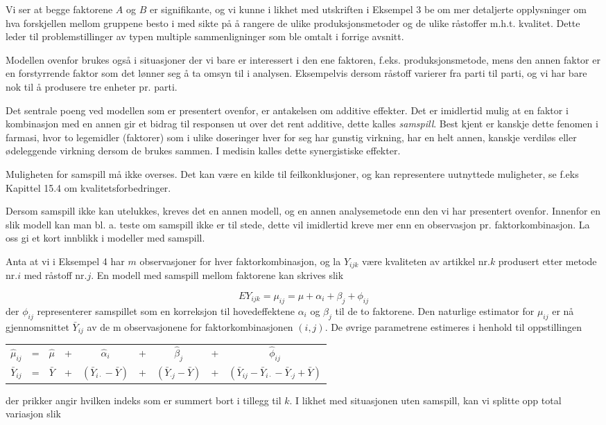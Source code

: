 \noindent Vi ser at begge faktorene $A$ og $B$ er signifikante, og vi kunne
i likhet med utskriften i Eksempel 3 be om mer detaljerte opplysninger om
hva forskjellen mellom gruppene besto i med sikte på å rangere
de ulike produksjonsmetoder og de ulike råstoffer m.h.t. kvalitet.
Dette leder til problemstillinger av typen multiple sammenligninger
som ble omtalt i forrige avsnitt.

Modellen ovenfor brukes også i situasjoner der vi bare er interessert
i den ene faktoren, f.eks. produksjonsmetode, mens den annen faktor
er en forstyrrende faktor som det lønner seg å ta omsyn til i
analysen. Eksempelvis dersom råstoff varierer fra parti til parti,
og vi har bare nok til å produsere tre enheter pr. parti.

Det sentrale poeng ved modellen som er presentert ovenfor,
er antakelsen om additive effekter.  Det er imidlertid mulig at en 
faktor i kombinasjon med en annen gir et bidrag til responsen ut over
det rent additive, dette kalles {\em samspill}.  Best kjent er kanskje
dette fenomen i farmasi, hvor to legemidler (faktorer) som i ulike 
doseringer hver for seg har gunstig virkning, har en helt annen, kanskje
verdiløs eller ødeleggende virkning dersom de brukes sammen.  I
medisin kalles dette synergistiske effekter.

Muligheten for samspill må ikke overses. Det kan være en
kilde til feilkonklusjoner, og kan representere uutnyttede muligheter,
se f.eks Kapittel 15.4 om kvalitetsforbedringer.

Dersom samspill ikke kan utelukkes, kreves
det en annen modell, og en annen analysemetode enn den vi har
presentert ovenfor.  Innenfor en slik modell kan man bl. a. teste om 
samspill ikke er til stede, dette vil imidlertid kreve mer enn en 
observasjon pr. faktorkombinasjon. La oss gi et kort innblikk i modeller
med samspill.

Anta at vi i Eksempel 4 har $m$ observasjoner for hver faktorkombinasjon,
og la $Y_{ijk}$ være kvaliteten av artikkel nr.$k$ produsert etter
metode nr.$i$ med råstoff nr.$j$. En modell med samspill mellom faktorene
 kan skrives slik

\[ EY_{ijk}={\mu}_{ij}=\mu +{\alpha}_i+{\beta}_j+{\phi}_{ij} \]
der ${\phi}_{ij}$ representerer samspillet som en korreksjon til
hovedeffektene ${\alpha}_i$ og ${\beta}_j$ til de to faktorene.
Den naturlige estimator for ${\mu}_{ij}$ er nå gjennomsnittet 
 $\bar{Y}_{ij}$ av de m observasjonene for faktorkombinasjonen 
 $(i,j)$. De øvrige parametrene estimeres i henhold til 
oppstillingen
\begin{center} \addtolength{\tabcolsep}{-0.4\tabcolsep}
\begin{tabular}{ccccccccc}
 $\hat{\mu}_{ij}$&=&$\hat{\mu}$&+&$\hat{\alpha}_i$&+
                            &$\hat{\beta}_j$&+&$\hat{\phi}_{ij}$ \\
 $\bar{Y}_{ij}$  &=&$\bar{Y}$&+&$(\bar{Y}_{i\cdot}-\bar{Y})$&+
     &$(\bar{Y}_{\cdot j}-\bar{Y})$&+
   &$(\bar{Y}_{ij}-\bar{Y}_{i\cdot}-\bar{Y}_{\cdot j}+\bar{Y})$
\end{tabular}
\end{center}
der prikker angir hvilken indeks som er summert bort i tillegg til $k$.
I likhet med situasjonen uten samspill, kan vi splitte opp total variasjon slik

